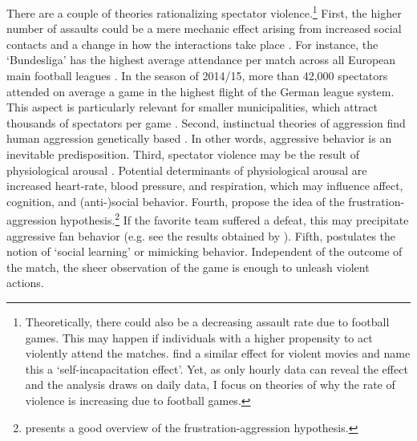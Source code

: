 There are a couple of theories rationalizing spectator violence.\footnote{Theoretically, there could also be a decreasing assault rate due to football games. This may happen if individuals with a higher propensity to act violently attend the matches. \cite{dahl2009movie} find a similar effect for violent movies and name this a `self-incapacitation effect'. Yet, as only hourly data can reveal the effect and the analysis draws on daily data, I focus on theories of why the rate of violence is increasing due to football games.} First, the higher number of assaults could be a mere mechanic effect arising from increased social contacts and a change in how the interactions take place \citep{montolio2019measuring}. For instance, the `Bundesliga' has the highest average attendance per match across all European main football leagues \citep{wicker2017effect}. In the season of 2014/15, more than 42,000 spectators attended on average a game in the highest flight of the German league system. This aspect is particularly relevant for smaller municipalities, which attract thousands of spectators per game \citep{lindo2018college}. Second, instinctual theories of aggression find human aggression genetically based \citep{baron1977human}. In other words, aggressive behavior is an inevitable predisposition. Third, spectator violence may be the result of physiological arousal \citep{branscombe1992role}. Potential determinants of physiological arousal are increased heart-rate, blood pressure, and respiration, which may influence affect, cognition, and (anti-)social behavior. Fourth, \cite{dollard1939frustration} propose the idea of the frustration-aggression hypothesis.\footnote{\cite{berkowitz1989frustration} presents a good overview of the frustration-aggression hypothesis.} If the favorite team suffered a defeat, this may precipitate aggressive fan behavior (e.g. see the results obtained by \cite{card2011family}). Fifth, \cite{bandura1973aggression, bandura2007social} postulates the notion of `social learning' or mimicking behavior. Independent of the outcome of the match, the sheer observation of the game is enough to unleash violent actions. 



